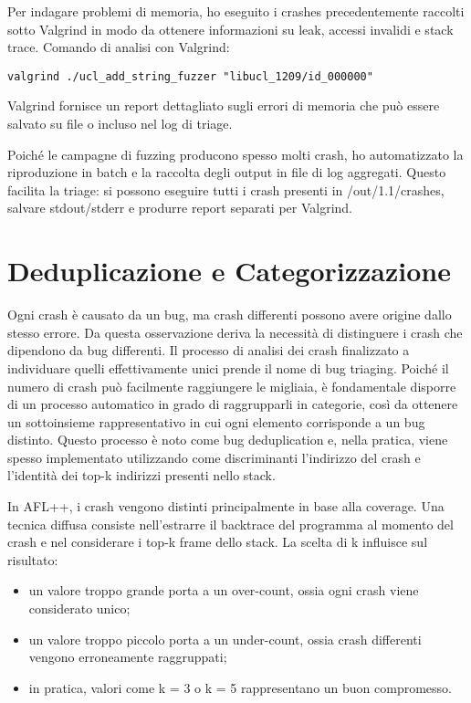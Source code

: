 Per indagare problemi di memoria, ho eseguito i crashes precedentemente raccolti sotto Valgrind in modo da ottenere informazioni su leak, accessi invalidi e stack trace.
Comando di analisi con Valgrind:

\begin{center}
\texttt{valgrind ./ucl\_add\_string\_fuzzer "libucl\_1209/id\_000000"}
\end{center}

Valgrind fornisce un report dettagliato sugli errori di memoria che può essere salvato su file o incluso nel log di triage.

Poiché le campagne di fuzzing producono spesso molti crash, ho automatizzato la riproduzione in batch e la raccolta degli output in file di log aggregati. Questo facilita la triage: si possono eseguire tutti i crash presenti in /out/1.1/crashes, salvare stdout/stderr e produrre report separati per Valgrind.

\section{Deduplicazione e Categorizzazione}

Ogni crash è causato da un bug, ma crash differenti possono avere origine dallo stesso errore. Da questa osservazione deriva la necessità di distinguere i crash che dipendono da bug differenti. Il processo di analisi dei crash finalizzato a individuare quelli effettivamente unici prende il nome di bug triaging. Poiché il numero di crash può facilmente raggiungere le migliaia, è fondamentale disporre di un processo automatico in grado di raggrupparli in categorie, così da ottenere un sottoinsieme rappresentativo in cui ogni elemento corrisponde a un bug distinto. Questo processo è noto come bug deduplication e, nella pratica, viene spesso implementato utilizzando come discriminanti l’indirizzo del crash e l’identità dei top-k indirizzi presenti nello stack.

In AFL++, i crash vengono distinti principalmente in base alla coverage. Una tecnica diffusa consiste nell’estrarre il backtrace del programma al momento del crash e nel considerare i top-k frame dello stack. La scelta di k influisce sul risultato:

\begin{itemize}
    \item un valore troppo grande porta a un over-count, ossia ogni crash viene considerato unico;
    \item un valore troppo piccolo porta a un under-count, ossia crash differenti vengono erroneamente raggruppati;
    \item in pratica, valori come k = 3 o k = 5 rappresentano un buon compromesso.
\end{itemize}

